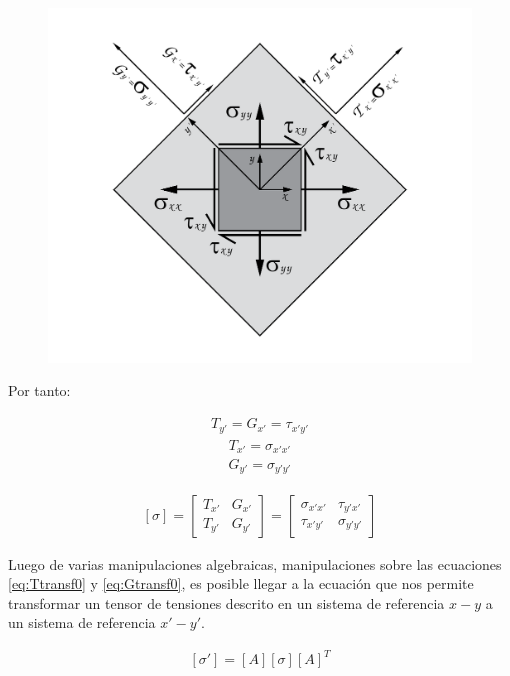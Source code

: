 \documentclass[12pt,letterpaper, twoside, openany]{article}
\begin{document}
\begin{figure}[H]
	\centering
		\includegraphics[width=12 cm]{img/Equivalencia.pdf}
		\caption{}
		\label{fig:equiv2D}
\end{figure}
%
Por tanto:
%
\begin{large}
	\begin{align}
		T_{y'} = G_{x'}=\tau_{x'y'}
	\end{align}
	\begin{align}
		T_{x'}=\sigma_{x'x'}
	\end{align}
	\begin{align}
		G_{y'}=\sigma_{y'y'}
	\end{align}
\end{large}
%
\begin{large}
	\begin{align}
		\left[\sigma\right]=
		\left[ \begin{array}{cc}
		T_{x'} & G_{x'} \\  
		T_{y'} & G_{y'}
		\end{array}  \right] =
		\left[ \begin{array}{cc}
		\sigma_{x'x'} & \tau_{y'x'} \\  
		\tau_{x'y'} & \sigma_{y'y'}
		\end{array}  \right]
		\label{eq:equiv}
	\end{align}
\end{large}
%
Luego de varias manipulaciones algebraicas, manipulaciones sobre las ecuaciones \ref{eq:Ttransf0} y \ref{eq:Gtransf0}, es posible llegar a la ecuación que nos permite transformar un tensor de tensiones descrito en un sistema de referencia $x-y$ a un sistema de referencia $x'-y'$.
%
\begin{large}
	\begin{align}
		\left[ \sigma' \right] = \left[ A \right] \left[ \sigma \right] \left[ A \right]^T 
		\label{eq:transforma2Dtensor}
	\end{align}
\end{large}
%
\end{document}
